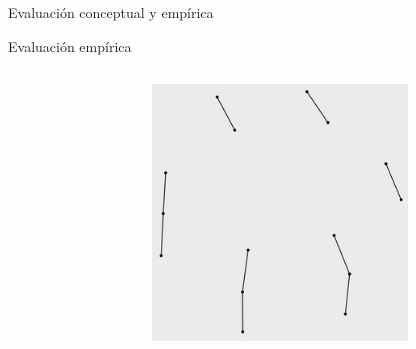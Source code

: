 \begin{frame}{Evaluación conceptual y empírica}
\begin{block}{Evaluación empírica}
\begin{minipage}[t][.40\textheight][t]{\textwidth}
\begin{columns}
\begin{column}{0.3\textwidth}
\begin{figure}[H]
\begin{center}
         \end{center}
    \end{figure}
    \end{column}
    \begin{column}{0.3\textwidth}  
    \tiny
    \begin{figure}[H]
        \begin{center}
         \includegraphics[width=0.8\textwidth]{images/C2/2009/filtrada.jpg}
         \end{center}
    \end{figure}
    \end{column}
    \end{columns}
    \end{minipage}

    \end{block}


\end{frame}

